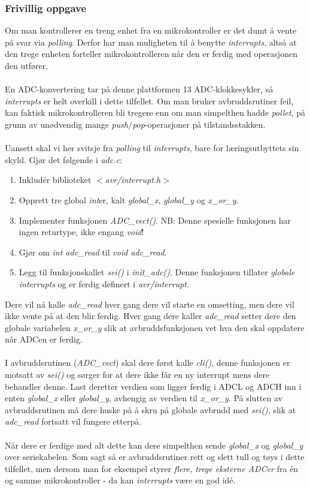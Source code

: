 \documentclass[11pt,a4paper]{article}
\begin{document}
\subsubsection{Frivillig oppgave}
Om man kontrollerer en treng enhet fra en mikrokontroller er det dumt å vente på svar via \textit{polling}. Derfor har man muligheten til å benytte \textit{interrupts}, altså at den trege enheten forteller mikrokontrolleren når den er ferdig med operasjonen den utfører.\\
\\
En ADC-konvertering tar på denne plattformen 13 ADC-klokkesykler, så \textit{interrupts} er helt overkill i dette tilfellet. Om man bruker avbruddsrutiner feil, kan faktisk mikrokontrolleren bli tregere enn om man simpelthen hadde \textit{pollet}, på grunn av unødvendig mange \textit{push}/\textit{pop}-operasjoner på tilstandsstakken.\\
\\
Uansett skal vi her svitsje fra \textit{polling} til \textit{interrupts}, bare for læringsutbyttets sin skyld. Gjør det følgende i \textit{adc.c}:
\begin{enumerate}
\item Inkludér biblioteket $<$\textit{avr/interrupt.h}$>$
\item Opprett tre global \textit{int}er, kalt \textit{global\_x}, \textit{global\_y} og \textit{x\_or\_y}.
\item Implementer funksjonen \textit{ADC\_vect()}. NB: Denne spesielle funksjonen har ingen returtype, ikke engang \textit{void}!
\item Gjør om \textit{int adc\_read} til \textit{void adc\_read}.
\item Legg til funksjonskallet \textit{sei()} i \textit{init\_adc()}. Denne funksjonen tillater \textit{globale interrupts} og er ferdig definert i \textit{avr/interrupt}.
\end{enumerate}
Dere vil nå kalle \textit{adc\_read} hver gang dere vil starte en omsetting, men dere vil ikke vente på at den blir ferdig. Hver gang dere kaller \textit{adc\_read} setter dere den globale variabelen \textit{x\_or\_y} slik at avbruddsfunksjonen vet hva den skal oppdatere når ADCen er ferdig.\\
\\
I avbruddsrutinen (\textit{ADC\_vect}) skal dere først kalle \textit{cli()}, denne funksjonen er motsatt av \textit{sei()} og sørger for at dere ikke får en ny interrupt mens dere behandler denne. Last deretter verdien som ligger ferdig i ADCL og ADCH inn i enten \textit{global\_x} eller \textit{global\_y}, avhengig av verdien til \textit{x\_or\_y}. På slutten av avbruddsrutinen må dere huske på å skru på globale avbrudd med \textit{sei()}, slik at \textit{adc\_read} fortsatt vil fungere etterpå.\\
\\
Når dere er ferdige med alt dette kan dere simpelthen sende \textit{global\_x} og \textit{global\_y} over seriekabelen. Som sagt så er avbruddsrutiner rett og slett tull og tøys i dette tilfellet, men dersom man for eksempel styrer \textit{flere, trege eksterne ADCer} fra én og samme mikrokontroller - da kan \textit{interrupts} være en god idé.
\end{document}
